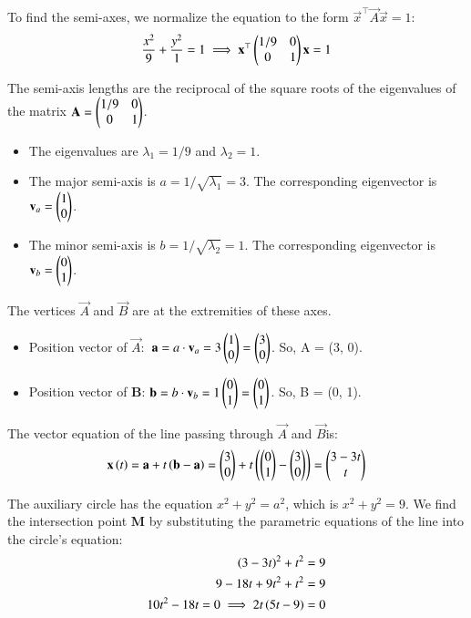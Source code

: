 \documentclass[journal]{IEEEtran}
\theoremstyle{remark}
\begin{document}
To find the semi-axes, we normalize the equation to the form $\vec{x}^\top\vec{A}\vec{x} = 1$:
\begin{align}
    \frac{x^2}{9} + \frac{y^2}{1} = 1 \implies \mathbf{x}^\top \begin{pmatrix}1/9 & 0 \\ 0 & 1\end{pmatrix} \mathbf{x} = 1
\end{align}
    
The semi-axis lengths are the reciprocal of the square roots of the eigenvalues of the matrix $\mathbf{A} = \begin{pmatrix}1/9 & 0 \\ 0 & 1\end{pmatrix}$.
\begin{itemize}
    \item The eigenvalues are $\lambda_1 = 1/9$ and $\lambda_2 = 1$.
    \item The major semi-axis is $a = 1/\sqrt{\lambda_1} = 3$. The corresponding eigenvector is $\mathbf{v}_a = \begin{pmatrix}1 \\ 0\end{pmatrix}$.
    \item The minor semi-axis is $b = 1/\sqrt{\lambda_2} = 1$. The corresponding eigenvector is $\mathbf{v}_b = \begin{pmatrix}0 \\ 1\end{pmatrix}$.
\end{itemize}
The vertices $\vec{A}$ and $\vec{B}$ are at the extremities of these axes.
\begin{itemize}
    \item Position vector of $\vec{A}:$ $\mathbf{a} = a \cdot \mathbf{v}_a = 3 \begin{pmatrix}1 \\ 0\end{pmatrix} = \begin{pmatrix}3 \\ 0\end{pmatrix}$. So, A = (3, 0).
    \item Position vector of \textbf{B}: $\mathbf{b} = b \cdot \mathbf{v}_b = 1 \begin{pmatrix}0 \\ 1\end{pmatrix} = \begin{pmatrix}0 \\ 1\end{pmatrix}$. So, B = (0, 1).
\end{itemize}

The vector equation of the line passing through $\vec{A}$ and $\vec{B} $is:
\begin{align}
    \mathbf{x}\left(t\right) = \mathbf{a} + t\left(\mathbf{b} - \mathbf{a}\right) = \begin{pmatrix}3 \\ 0\end{pmatrix} + t\left(\begin{pmatrix}0 \\ 1\end{pmatrix} - \begin{pmatrix}3 \\ 0\end{pmatrix}\right) = \begin{pmatrix}3 - 3t \\ t\end{pmatrix}
\end{align}
    

The auxiliary circle has the equation $x^2 + y^2 = a^2$, which is $x^2 + y^2 = 9$. We find the intersection point \textbf{M} by substituting the parametric equations of the line into the circle's equation:
\begin{align}
 \left(3 - 3t\right)^2 + t^2 = 9\\
    9 - 18t + 9t^2 + t^2 = 9\\
    10t^2 - 18t = 0 \implies 2t\left(5t - 9\right) = 0
\end{align}
   
\end{document}
